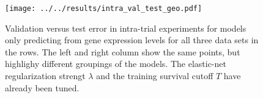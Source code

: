 \begin{figure}
    \centering
    \texttt{[image: ../../results/intra\_val\_test\_geo.pdf]}
    \caption{Validation versus test error in intra-trial experiments for models only predicting 
        from gene expression levels for all 
        three data sets in the rows. The left and right column show the same points, but highlighy 
        different groupings of the models. The elastic-net regularization strengt $\lambda$ and the 
        training survival cutoff $T$ have already been tuned.}
    \label{fig:intra-val-test-geo}
\end{figure}
